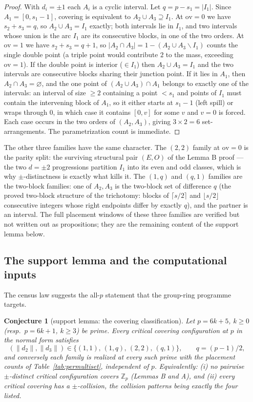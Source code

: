 \documentclass[11pt,a4paper]{article}
\numberwithin{equation}{section}
\theoremstyle{plain}
\newtheorem{conjecture}[theorem]{Conjecture}
\theoremstyle{definition}
\theoremstyle{remark}
\newcommand{\Z}{\mathbb{Z}}
\begin{document}
\begin{proof}
With $d_i=\pm1$ each $A_i$ is a cyclic interval. Let $q=p-s_1=|I_1|$. Since
$A_1=[0,s_1-1]$, covering is equivalent to $A_2\cup A_3\supseteq I_1$.
At $\mathrm{ov}=0$ we have $s_2+s_3=q$, so $A_2\cup A_3=I_1$ exactly; both
intervals lie in $I_1$, and two intervals whose union is the arc $I_1$ are
its consecutive blocks, in one of the two orders. At $\mathrm{ov}=1$ we have
$s_2+s_3=q+1$, so $|A_2\cap A_3|=1-(A_2\cup A_3\smallsetminus I_1)$ counts
the single double point (a triple point would contribute $2$ to the mass,
exceeding $\mathrm{ov}=1$). If the double point is interior
($\in I_1$) then $A_2\cup A_3=I_1$ and the two intervals are consecutive
blocks sharing their junction point. If it lies in $A_1$, then
$A_2\cap A_3=\varnothing$, and the one point of $(A_2\cup A_3)\cap A_1$
belongs to exactly one of the intervals: an interval of size $\ge2$
containing a point $<s_1$ and points of $I_1$ must contain the intervening
block of $A_1$, so it either starts at $s_1-1$ (left spill) or wraps through
$0$, in which case it contains $[0,v]$ for some $v$ and $v=0$ is forced.
Each case occurs in the two orders of $(A_2,A_3)$, giving $3\times2=6$
set-arrangements. The parametrization count is immediate.
\end{proof}

The other three families have the same character. The $(2,2)$ family at
$\mathrm{ov}=0$ is the parity split: the surviving structural pair
$(E,O)$ of the Lemma B proof --- the two $d=\pm2$ progressions partition
$I_1$ into its even and odd classes, which is why $\pm$-distinctness is
exactly what kills it. The $(1,q)$ and $(q,1)$ families are the two-block
families: one of $A_2,A_3$ is the two-block set of difference $q$
(the proved two-block structure of the trichotomy: blocks of
$\lceil s/2\rceil$ and $\lfloor s/2\rfloor$ consecutive integers whose right
endpoints differ by exactly $q$), and the partner is an interval. The full
placement windows of these three families are verified but not written out
as propositions; they are the remaining content of the support lemma below.

\subsection{The support lemma and the computational inputs}
\label{sec:gt-support}

The census law suggests the all-$p$ statement that the group-ring programme
targets.

\begin{conjecture}[support lemma: the covering classification]\label{conj:SL}
Let $p=6k+5$, $k\ge0$ (resp.\ $p=6k+1$, $k\ge3$) be prime. Every critical
covering configuration at $p$ in the normal form satisfies
\[
(\|d_2\|,\|d_3\|)\in\{(1,1),\,(1,q),\,(2,2),\,(q,1)\},
\qquad q=(p-1)/2,
\]
and conversely each family is realized at every such prime with the
placement counts of Table~\ref{tab:permultiset}, independent of $p$.
Equivalently: \textup{(i)} no pairwise $\pm$-distinct critical
configuration covers $\Z_p$ (Lemmas B and A), and \textup{(ii)} every
critical covering has a $\pm$-collision, the collision patterns being
exactly the four listed.
\end{conjecture}
\end{document}
